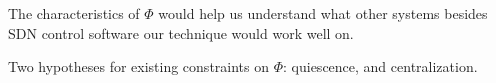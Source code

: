The characteristics of $\Phi$ would help us understand what other systems besides
SDN control software our technique would work well on.

Two hypotheses for existing constraints on $\Phi$: quiescence, and centralization.
